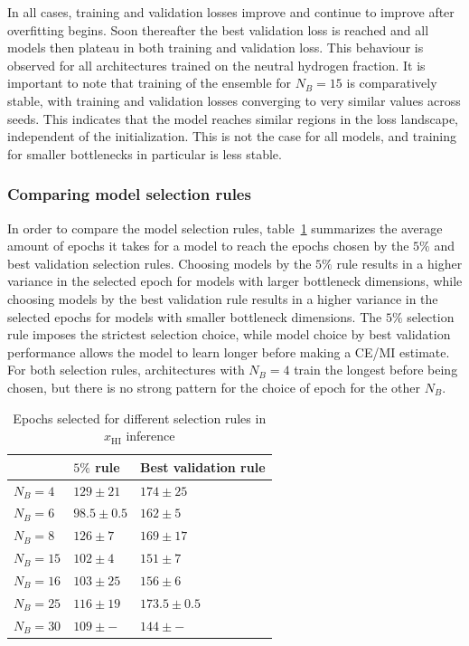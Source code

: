 In all cases, training and validation losses improve and continue to improve after overfitting begins. Soon thereafter the best validation loss is reached and all models then plateau in both training and validation loss. This behaviour is observed for all architectures trained on the neutral hydrogen fraction. It is important to note that training of the ensemble for $N_B=15$ is comparatively stable, with training and validation losses converging to very similar values across seeds. This indicates that the model reaches similar regions in the loss landscape, independent of the initialization. This is not the case for all models, and training for smaller bottlenecks in particular is less stable.

\subsubsection*{Comparing model selection rules}
In order to compare the model selection rules, table~\ref{tab:training_stability} summarizes the average amount of epochs it takes for a model to reach the epochs chosen by the $5\%$ and best validation selection rules. Choosing models by the $5\%$ rule results in a higher variance in the selected epoch for models with larger bottleneck dimensions, while choosing models by the best validation rule results in a higher variance in the selected epochs for models with smaller bottleneck dimensions. The $5\%$ selection rule imposes the strictest selection choice, while model choice by best validation performance allows the model to learn longer before making a CE/MI estimate. For both selection rules, architectures with $N_B=4$ train the longest before being chosen, but there is no strong pattern for the choice of epoch for the other $N_B$. 
\begin{table}[htbp]
\centering
\caption{Epochs selected for different selection rules in $x_\text{HI}$ inference}
\label{tab:training_stability}
\begin{tabular}{l| l l}
\toprule

 & $5\%$ rule & Best validation rule \\
\midrule
$N_B=4$  & $129\pm21$ & $174\pm25$ \\
$N_B=6$  & $98.5\pm0.5$  & $162\pm5$ \\
$N_B=8$  & $126\pm7$ & $169\pm17$ \\
$N_B=15$ & $102\pm4$ & $151\pm7$ \\
$N_B=16$ & $103\pm25$ & $156\pm6$ \\
$N_B=25$ & $116\pm19$ & $173.5\pm0.5$ \\
$N_B=30$ & $109\pm -$ & $144\pm -$ \\

\bottomrule
\end{tabular}
\end{table}

